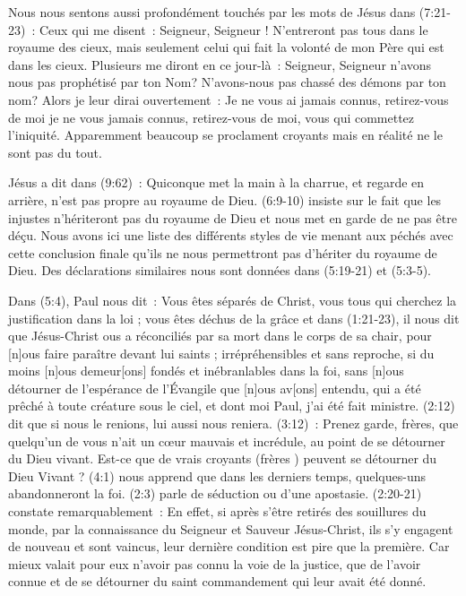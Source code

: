 \begin{enumerate}
Nous nous sentons aussi profondément touchés par les mots de Jésus dans (7:21-23)~:
 \og Ceux qui me disent~: Seigneur, Seigneur ! N'entreront pas tous dans le royaume des cieux,
 mais seulement celui qui fait la volonté de mon Père qui est dans les cieux.
 Plusieurs me diront en ce jour-là~: Seigneur, Seigneur n'avons nous pas prophétisé par  ton Nom?
 N'avons-nous pas chassé des démons par ton nom? Alors je leur dirai ouvertement~:
 Je ne vous ai jamais connus, retirez-vous de moi je ne vous jamais connus, retirez-vous de moi,
 vous qui commettez l'iniquité. \fg{}
 Apparemment beaucoup se proclament croyants mais en réalité ne le sont pas du tout.

Jésus a dit dans (9:62)~: \og Quiconque met la main à la charrue,
 et regarde en arrière, n'est pas propre au royaume de Dieu. \fg{}
 (6:9-10) insiste sur le fait que \og les injustes n'hériteront pas du royaume de Dieu \fg{}
 et nous met en garde de ne pas être déçu. Nous avons ici une liste des différents styles de vie
 menant aux péchés avec cette conclusion finale qu'ils ne nous permettront pas d'hériter du royaume de Dieu.
 Des déclarations similaires nous sont données dans (5:19-21) et (5:3-5).

Dans (5:4), Paul nous dit~: \og Vous êtes séparés de Christ,
 vous tous qui cherchez la justification dans la loi ; vous êtes déchus de la grâce \fg{}
 et dans (1:21-23), il nous dit que Jésus-Christ
 \og [n]ous a réconciliés par sa mort dans le corps de sa chair,
 pour [n]ous faire paraître devant lui saints ; irrépréhensibles et sans reproche,
 si du moins [n]ous demeur[ons] fondés et inébranlables dans la foi,
 sans [n]ous détourner de l'espérance de l'Évangile que [n]ous av[ons] entendu,
 qui a été prêché à toute créature sous le ciel, et dont moi Paul, j'ai été fait ministre. \fg{}
 (2:12) dit que \og si nous le renions, lui aussi nous reniera. \og
 (3:12)~: \og Prenez garde, frères, que quelqu'un de vous n'ait un cœur mauvais
 et incrédule, au point de se détourner du Dieu vivant. \fg{}
 Est-ce que de vrais croyants (\og frères \fg{}) peuvent se détourner du Dieu Vivant ?
 (4:1) nous apprend que \og dans les derniers temps, quelques-uns abandonneront la foi. \fg{}
 (2:3) parle de \og séduction \fg{} ou d'une apostasie.
 (2:20-21) constate remarquablement~: \og En effet, si après s'être retirés
 des souillures du monde, par la connaissance du Seigneur et Sauveur Jésus-Christ,
 ils s'y engagent de nouveau et sont vaincus, leur dernière condition est pire que la première.
 Car mieux valait pour eux n'avoir pas connu la voie de la justice,
 que de l'avoir connue et de se détourner du saint commandement  qui leur avait été donné. \fg{}


\end{enumerate}
